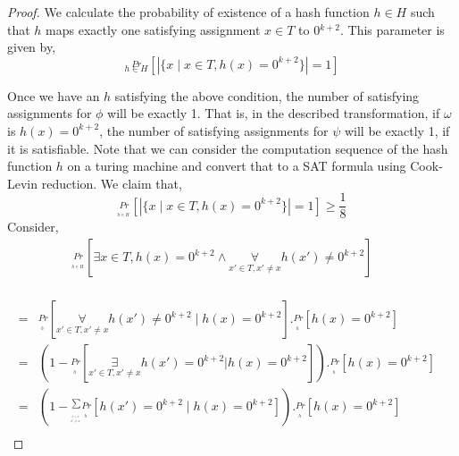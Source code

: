 \documentclass[11pt]{article}
\begin{document}
\begin{proof}
We calculate the probability of existence of a hash function $h \in H$ such that $h$ maps exactly one satisfying assignment $x \in T$ to 0$^{k+2}$. This parameter is given by,
\[
\stackrel{Pr}{_{h \in H}}[|\{x \mid x \in T, h(x)=0^{k+2}\}|=1]
\]

Once we have an $h$ satisfying the above condition, the number of satisfying assignments for $\phi$ will be exactly 1. That is, in the described transformation, if $\omega$ is $h(x)=0^{k+2}$, the number of satisfying assignments for $\psi$ will be exactly 1, if it is satisfiable. Note that we can consider the computation sequence of the hash function $h$ on a turing machine and convert that to a SAT formula using Cook-Levin reduction. We claim that,  
\[
\stackrel{Pr}{_{_{_{h \in H}}}}[|\{x \mid x \in T, h(x)=0^{k+2}\}|=1] \geq \frac{1}{8}
\]
Consider, 
\begin{eqnarray*}
\stackrel{Pr}{_{_{_{h \in H}}}}[\exists x \in T, h(x)=0^{k+2} \wedge \underset{x' \in T,x' \neq x}\forall h(x') \neq 
0^{k+2}] & & \\
\end{eqnarray*}

\begin{eqnarray*}
= & \stackrel{Pr}{_{_{_{h}}}}[\underset{x' \in T,x' \neq x}\forall h(x') \neq 0^{k+2} \mid h(x)=0^{k+2}].\stackrel{Pr}{_{_{_{h}}}}[h(x)=0^{k+2}] & \\
= & (1-\stackrel{Pr}{_{_{_{h}}}}[\underset{x' \in T,x' \neq x}\exists h(x') = 0^{k+2}|h(x)=0^{k+2}]).\stackrel{Pr}{_{_{_{h}}}}[h(x)=0^{k+2}] & \\
= & (1-\stackrel{\sum}{_{_{_{_{\stackrel{x' \in T}{x' \neq x}}}}}}\stackrel{Pr}{_{_{_{h}}}}[h(x')=0^{k+2}\mid h(x)=0^{k+2}]).\stackrel{Pr}{_{_{_{h}}}}[h(x)=0^{k+2}] & \\
\end{eqnarray*}


\end{proof}
\end{document}
